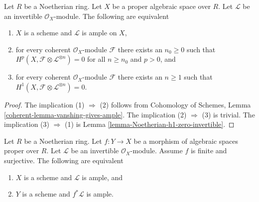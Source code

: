\begin{lemma}
\label{lemma-vanshing-gives-ample}
Let $R$ be a Noetherian ring. Let $X$ be a proper algebraic space
over $R$. Let $\mathcal{L}$ be an invertible $\mathcal{O}_X$-module.
The following are equivalent
\begin{enumerate}
\item $X$ is a scheme and $\mathcal{L}$ is ample on $X$,
\item for every coherent $\mathcal{O}_X$-module $\mathcal{F}$ there exists
an $n_0 \geq 0$ such that
$H^p(X, \mathcal{F} \otimes \mathcal{L}^{\otimes n}) = 0$ for all $n \geq n_0$
and $p > 0$, and
\item for every coherent $\mathcal{O}_X$-module $\mathcal{F}$ there exists
an $n \geq 1$ such that
$H^1(X, \mathcal{F} \otimes \mathcal{L}^{\otimes n}) = 0$.
\end{enumerate}
\end{lemma}

\begin{proof}
The implication (1) $\Rightarrow$ (2) follows from
Cohomology of Schemes, Lemma \ref{coherent-lemma-vanshing-gives-ample}.
The implication (2) $\Rightarrow$ (3) is trivial.
The implication (3) $\Rightarrow$ (1) is
Lemma \ref{lemma-Noetherian-h1-zero-invertible}.
\end{proof}

\begin{lemma}
\label{lemma-surjective-finite-morphism-ample}
Let $R$ be a Noetherian ring. Let $f : Y \to X$ be a morphism of
algebraic spaces proper over $R$. Let $\mathcal{L}$ be an
invertible $\mathcal{O}_X$-module. Assume $f$ is finite and surjective.
The following are equivalent
\begin{enumerate}
\item $X$ is a scheme and $\mathcal{L}$ is ample, and
\item $Y$ is a scheme and $f^*\mathcal{L}$ is ample.
\end{enumerate}
\end{lemma}

